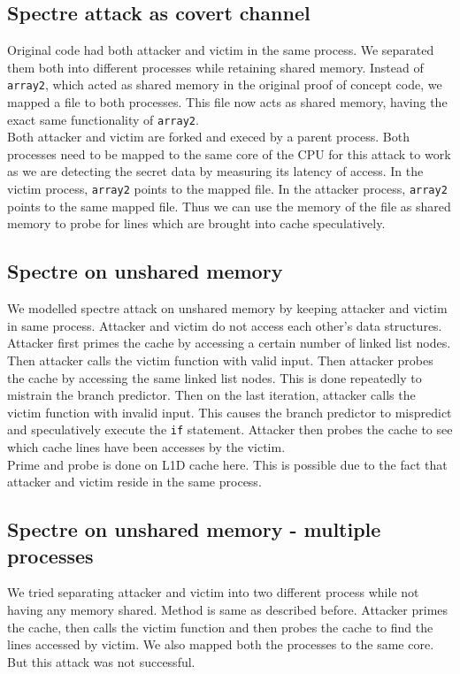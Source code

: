 \subsection{Spectre attack as covert channel}
Original code had both attacker and victim in the same process. We separated them both into different processes while retaining shared memory. Instead of \texttt{array2}, which acted as shared memory in the original proof of concept code, we mapped a file to both processes. This file now acts as shared memory, having the exact same functionality of \texttt{array2}. \\
\indent Both attacker and victim are forked and execed by a parent process. Both processes need to be mapped to the same core of the CPU for this attack to work as we are detecting the secret data by measuring its latency of access. In the victim process, \texttt{array2} points to the mapped file. In the attacker process, \texttt{array2} points to the same mapped file. Thus we can use the memory of the file as shared memory to probe for lines which are brought into cache speculatively.

\subsection{Spectre on unshared memory}
We modelled spectre attack on unshared memory by keeping attacker and victim in same process. Attacker and victim do not access each other's data structures. Attacker first primes the cache by accessing a certain number of linked list nodes. Then attacker calls the victim function with valid input. Then attacker probes the cache by accessing the same linked list nodes. This is done repeatedly to mistrain the branch predictor. Then on the last iteration, attacker calls the victim function with invalid input. This causes the branch predictor to mispredict and speculatively execute the \texttt{if} statement. Attacker then probes the cache to see which cache lines have been accesses by the victim. \\
\indent Prime and probe is done on L1D cache here. This is possible due to the fact that attacker and victim reside in the same process. 

\subsection{Spectre on unshared memory - multiple processes}
We tried separating attacker and victim into two different process while not having any memory shared. Method is same as described before. Attacker primes the cache, then calls the victim function and then probes the cache to find the lines accessed by victim. We also mapped both the processes to the same core. But this attack was not successful.